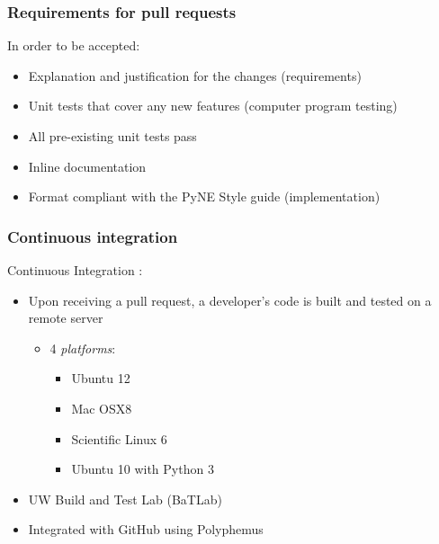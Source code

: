 \documentclass[12pt]{beamer}
\begin{document}
\begin{frame}
\frametitle{Requirements for pull requests}

In order to be accepted:

\begin{itemize}
\item{Explanation and justification for the changes (\alert{requirements})}
\item{Unit tests that cover any new features (\alert{computer program testing})}
\item{All pre-existing unit tests pass}
\item{Inline documentation}
\item{Format compliant with the PyNE Style guide (\alert{implementation})}
\end{itemize}

\end{frame}

\begin{frame}
\frametitle{Continuous integration}

Continuous Integration \cite{beck1998extreme}:

\begin{itemize}
\item{Upon receiving a pull request, a developer's code is built and tested on a remote server}
    \begin{itemize}
    \item{4 \emph{platforms}:}
        \begin{itemize}
        \item{Ubuntu 12}
        \item{Mac OSX8}
        \item{Scientific Linux 6}
        \item{Ubuntu 10 with Python 3}
        \end{itemize}
    \end{itemize}
\item{UW Build and Test Lab (BaTLab) \cite{batlab_2014}}
\item{Integrated with GitHub using Polyphemus \cite{polyphemus_2014}}
\end{itemize}
\end{frame}
\end{document}
